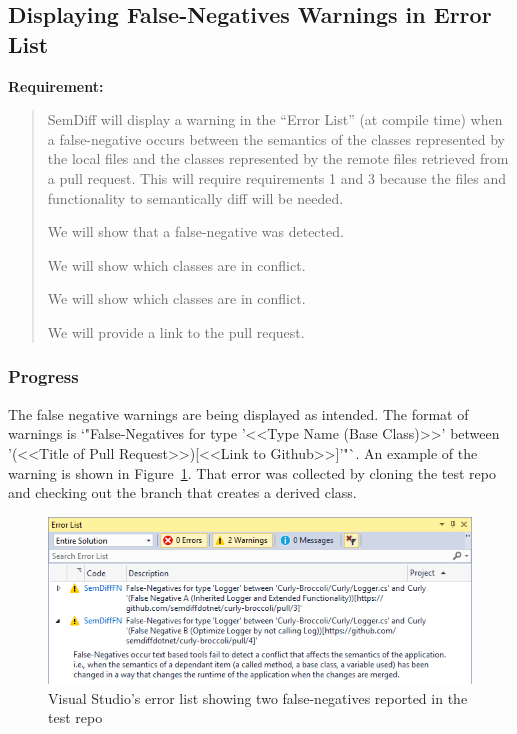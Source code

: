 \documentclass[draftclsnofoot,onecolumn]{IEEEtran}
\begin{document}
\subsection{Displaying False-Negatives Warnings in Error List}

\textbf{Requirement:}

\begin{quote}

SemDiff will display a warning in the “Error List” (at compile time) when a 
false-negative occurs between the semantics of the classes represented by 
the local files and the classes represented by the remote files retrieved 
from a pull request. This will require requirements 1 and 3 because the 
files and functionality to semantically diff will be needed.

We will show that a false-negative was detected.

We will show which classes are in conflict.

We will show which classes are in conflict.

We will provide a link to the pull request.

\end{quote}

\subsubsection{Progress}

The false negative warnings are being displayed as intended. The format of 
warnings is `"False-Negatives for type '<<Type Name (Base Class)>>' between 
'(<<Title of Pull Request>>)[<<Link to Github>>]'"`. An example of the 
warning is shown in Figure~\ref{fnerrorlist}. That error was collected by 
cloning the test repo and checking out the branch that creates a derived class.

\begin{figure}[!t]
\centering
\includegraphics[width=\textwidth]{FalseNegativeErrorList}

\caption{Visual Studio’s error list showing two false-negatives reported in 
the test repo}
\label{fnerrorlist}
\end{figure}
\end{document}
